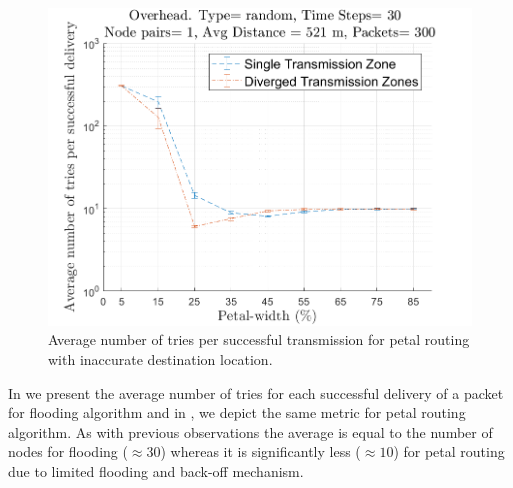 \begin{figure}[hbtp]
\centering
\includegraphics[width=\simResultFigSize\textwidth]{ncsuthesis-0.6/Chapter-5/figs/mob_pe_trans_random.png}
\caption{Average number of tries per successful transmission for petal routing with inaccurate destination location.}
\label{fig:mob_pe_trans_random}
\end{figure}

In  we present the average number of tries for each successful delivery of a packet for flooding algorithm and in , we depict the same metric for petal routing algorithm. As with previous observations the average is equal to the number of nodes for flooding ($\approx 30$) whereas it is significantly less ($\approx 10$) for petal routing due to limited flooding and back-off mechanism. 